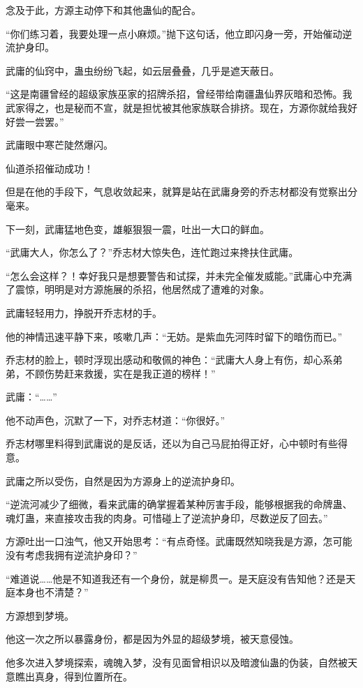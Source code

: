\begin{this_body}
念及于此，方源主动停下和其他蛊仙的配合。

“你们练习着，我要处理一点小麻烦。”抛下这句话，他立即闪身一旁，开始催动逆流护身印。

武庸的仙窍中，蛊虫纷纷飞起，如云层叠叠，几乎是遮天蔽日。

“这是南疆曾经的超级家族巫家的招牌杀招，曾经带给南疆蛊仙界灰暗和恐怖。我武家得之，也是秘而不宣，就是担忧被其他家族联合排挤。现在，方源你就给我好好尝一尝罢。”

武庸眼中寒芒陡然爆闪。

仙道杀招催动成功！

但是在他的手段下，气息收敛起来，就算是站在武庸身旁的乔志材都没有觉察出分毫来。

下一刻，武庸猛地色变，雄躯狠狠一震，吐出一大口的鲜血。

“武庸大人，你怎么了？”乔志材大惊失色，连忙跑过来搀扶住武庸。

“怎么会这样？！幸好我只是想要警告和试探，并未完全催发威能。”武庸心中充满了震惊，明明是对方源施展的杀招，他居然成了遭难的对象。

武庸轻轻用力，挣脱开乔志材的手。

他的神情迅速平静下来，咳嗽几声：“无妨。是紫血先河阵时留下的暗伤而已。”

乔志材的脸上，顿时浮现出感动和敬佩的神色：“武庸大人身上有伤，却心系弟弟，不顾伤势赶来救援，实在是我正道的榜样！”

武庸：“……”

他不动声色，沉默了一下，对乔志材道：“你很好。”

乔志材哪里料得到武庸说的是反话，还以为自己马屁拍得正好，心中顿时有些得意。

武庸之所以受伤，自然是因为方源身上的逆流护身印。

“逆流河减少了细微，看来武庸的确掌握着某种厉害手段，能够根据我的命牌蛊、魂灯蛊，来直接攻击我的肉身。可惜碰上了逆流护身印，尽数逆反了回去。”

方源吐出一口浊气，他又开始思考：“有点奇怪。武庸既然知晓我是方源，怎可能没有考虑我拥有逆流护身印？”

“难道说……他是不知道我还有一个身份，就是柳贯一。是天庭没有告知他？还是天庭本身也不清楚？”

方源想到梦境。

他这一次之所以暴露身份，都是因为外显的超级梦境，被天意侵蚀。

他多次进入梦境探索，魂魄入梦，没有见面曾相识以及暗渡仙蛊的伪装，自然被天意瞧出真身，得到位置所在。


\end{this_body}

